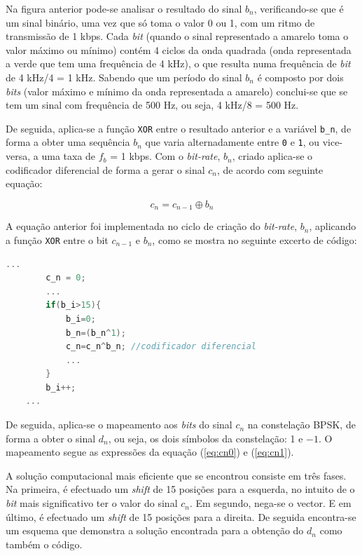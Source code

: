 \documentclass[11pt]{article}
\numberwithin{equation}{section}
\begin{document}
Na figura anterior pode-se analisar o resultado do sinal $b_n$, verificando-se que é um sinal binário, uma vez que só toma o valor 0 ou 1, com um ritmo de transmissão de 1 kbps. Cada \textit{bit} (quando o sinal representado a amarelo toma o valor máximo ou mínimo) contém 4 ciclos da onda quadrada (onda representada a verde que tem uma frequência de 4 kHz), o que resulta numa frequência de \textit{bit} de 4 kHz/4 = 1 kHz. Sabendo que um período do sinal $b_n$ é composto por dois \textit{bits} (valor máximo e mínimo da onda representada a amarelo) conclui-se que se tem um sinal com frequência de 500 Hz, ou seja, 4 kHz/8 = 500 Hz.


De seguida, aplica-se a função \texttt{XOR} entre o resultado anterior e a variável \texttt{b\_n}, de forma a obter uma sequência $b_n$ que varia alternadamente entre \texttt{0} e \texttt{1}, ou vice-versa, a uma taxa de $f_b$ = 1 kbps. Com o \textit{bit-rate}, $b_n$, criado aplica-se o codificador diferencial de forma a gerar o sinal $c_n$, de acordo com seguinte equação:

\vspace{-3mm}
\begin{equation}
	c_n = c_{n-1} \oplus b_n
\end{equation} 

\vspace{1mm}
A equação anterior foi implementada no ciclo de criação do \textit{bit-rate}, $b_n$,  aplicando a função \texttt{XOR} entre o bit $c_{n-1}$ e $b_n$, como se mostra no seguinte excerto de código:

\begin{lstlisting}[language=C]
	...
		c_n = 0;
		...
		if(b_i>15){
			b_i=0;
			b_n=(b_n^1);
			c_n=c_n^b_n; //codificador diferencial
			...
		}
		b_i++;
	...
\end{lstlisting}
		
De seguida, aplica-se o mapeamento aos \textit{bits} do sinal $c_n$ na constelação BPSK, de forma a obter o sinal $d_n$, ou seja, os dois símbolos da constelação: 1 e $-1$. O mapeamento segue as expressões da equação (\ref{eq:cn0}) e (\ref{eq:cn1}).
	 
A solução computacional mais eficiente que se encontrou consiste em três fases. Na primeira, é efectuado um \textit{shift} de 15 posições para a esquerda, no intuito de o \textit{bit} mais significativo ter o valor do sinal $c_n$. Em segundo, nega-se o vector. E em último, é efectuado um \textit{shift} de 15 posições para a direita. De seguida encontra-se um esquema que demonstra a solução encontrada para a obtenção do $d_n$ como também o código.
\end{document}
